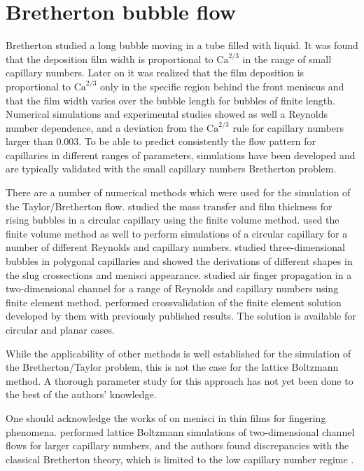 \documentclass{article}
\newcommand{\Ca}{\mathrm{Ca}}
\begin{document}
\section{Bretherton bubble flow}
Bretherton \cite{bretherton} studied a long bubble
moving in a tube filled with liquid. It was found that the deposition film width
is proportional to $\Ca^{2/3}$ in the range of small capillary numbers. Later on
it was realized \cite{wong-films,wong-pressure} that the film deposition
is proportional to $\Ca^{2/3}$ only in the specific region behind the front meniscus and
that the film width
varies over the bubble length for bubbles of finite length. Numerical
simulations \cite{giavedoni-numerical} and experimental studies
\cite{kreutzer-pressure-drop} showed as well a Reynolds number dependence, and
a deviation from the $\Ca^{2/3}$ rule for capillary numbers larger than $0.003$.
To be able to predict consistently the flow pattern for capillaries in
different ranges of parameters, simulations have been developed and are typically validated with the
small capillary numbers Bretherton problem.

There are a number of numerical methods which
were used for the simulation of the Taylor/Bretherton flow.
\citet{vanbaten-circular} studied the mass transfer and film
thickness for rising bubbles in a circular capillary using the finite volume method.
\citet{kreutzer-pressure-drop} used the finite volume method as well to perform
simulations of a circular capillary for a number of different
Reynolds and capillary numbers. \citeauthor{wong-films} \cite{wong-films,wong-pressure} studied
three-dimensional bubbles in
polygonal capillaries and showed the derivations of different shapes in the
slug crossections and menisci appearance.
\citet{heil-bretherton,ingham-plates} studied air finger propagation in
a two-dimensional channel for a range of Reynolds and capillary
numbers using finite element method. \citet{giavedoni-numerical} performed crossvalidation of the
finite element solution developed by them with previously published results.
The solution is available for circular and planar cases.

While the applicability of other methods is well established for the
simulation of the Bretherton/Taylor problem, this is not the case for
the lattice Boltzmann method. A thorough parameter study for this approach
has not yet been done to the best of the authors' knowledge.

One should acknowledge the works of \citet{pagonabarraga-fingers} on menisci
in thin films for fingering phenomena. \citet{sehgal-microchannel} performed lattice Boltzmann
simulations of two-dimensional channel flows for larger capillary numbers, and
the authors found discrepancies with the classical Bretherton theory, which
is limited to the low capillary number regime \cite{giavedoni-numerical}.
\end{document}
